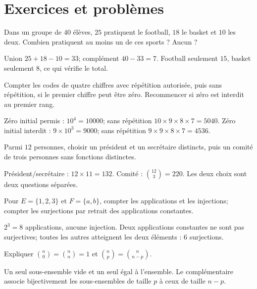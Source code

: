\section{Exercices et problèmes}
\exo[Union]\label{t11s-c19-e01}
Dans un groupe de $40$ élèves, $25$ pratiquent le football, $18$ le basket et $10$ les deux. Combien pratiquent au moins un de ces sports ? Aucun ?
\begin{corrige}\label{sol-t11s-c19-e01}
Union $25+18-10=33$; complément $40-33=7$. Football seulement $15$, basket seulement $8$, ce qui vérifie le total.
\end{corrige}
\exo[Codes]\label{t11s-c19-e02}
Compter les codes de quatre chiffres avec répétition autorisée, puis sans répétition, si le premier chiffre peut être zéro. Recommencer si zéro est interdit au premier rang.
\begin{corrige}\label{sol-t11s-c19-e02}
Zéro initial permis : $10^4=10000$; sans répétition $10\times9\times8\times7=5040$. Zéro initial interdit : $9\times10^3=9000$; sans répétition $9\times9\times8\times7=4536$.
\end{corrige}
\exo[Responsabilités]\label{t11s-c19-e03}
Parmi $12$ personnes, choisir un président et un secrétaire distincts, puis un comité de trois personnes sans fonctions distinctes.
\begin{corrige}\label{sol-t11s-c19-e03}
Président/secrétaire : $12\times11=132$. Comité : $\binom{12}3=220$. Les deux choix sont deux questions séparées.
\end{corrige}
\exo[Applications]\label{t11s-c19-e04}
Pour $E=\{1,2,3\}$ et $F=\{a,b\}$, compter les applications et les injections; compter les surjections par retrait des applications constantes.
\begin{corrige}\label{sol-t11s-c19-e04}
$2^3=8$ applications, aucune injection. Deux applications constantes ne sont pas surjectives; toutes les autres atteignent les deux éléments : $6$ surjections.
\end{corrige}
\exo[Frontières]\label{t11s-c19-e05}
Expliquer $\binom n0=\binom nn=1$ et $\binom np=\binom n{n-p}$.
\begin{corrige}\label{sol-t11s-c19-e05}
Un seul sous-ensemble vide et un seul égal à l’ensemble. Le complémentaire associe bijectivement les sous-ensembles de taille $p$ à ceux de taille $n-p$.
\end{corrige}
\label{t11s-c19-e06}
